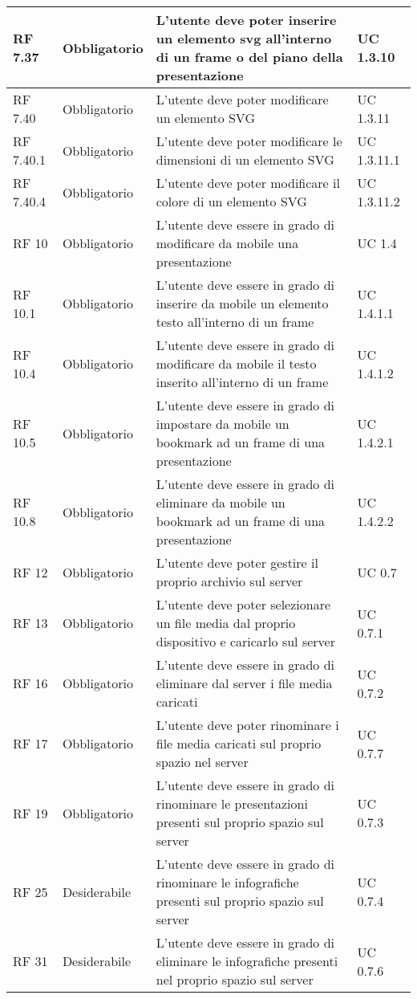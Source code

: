 {\begin{longtable} [c]{| p{2.5cm} | p{2.5cm} | p{6cm} |p{2.5cm}|}
 \hline 
RF 7.37 & Obbligatorio & L'utente deve poter inserire un elemento svg all'interno di un frame o del piano della presentazione & UC 1.3.10\\ 
 \hline 
RF 7.40 & Obbligatorio & L'utente deve poter modificare un elemento SVG & UC 1.3.11\\ 
 \hline 
RF 7.40.1 & Obbligatorio & L'utente deve poter modificare le dimensioni di un elemento SVG & UC 1.3.11.1\\ 
 \hline 
RF 7.40.4 & Obbligatorio & L'utente deve poter modificare il colore di un elemento SVG & UC 1.3.11.2\\ 
 \hline 
RF 10 & Obbligatorio & L’utente deve essere in grado di modificare da mobile una presentazione & UC 1.4\\ 
 \hline 
RF 10.1 & Obbligatorio & L'utente deve essere in grado di inserire da mobile un elemento testo all'interno di un frame & UC 1.4.1.1\\ 
 \hline 
RF 10.4 & Obbligatorio & L'utente deve essere in grado di modificare da mobile il testo inserito all'interno di un frame & UC 1.4.1.2\\ 
 \hline 
RF 10.5 & Obbligatorio & L'utente deve essere in grado di impostare da mobile un bookmark ad un frame di una presentazione & UC 1.4.2.1\\ 
 \hline 
RF 10.8 & Obbligatorio & L'utente deve essere in grado di eliminare da mobile un bookmark ad un frame di una presentazione & UC 1.4.2.2\\ 
 \hline 
RF 12 & Obbligatorio & L'utente deve poter gestire il proprio archivio sul server & UC 0.7\\ 
 \hline 
RF 13 & Obbligatorio & L’utente deve poter selezionare un file media dal proprio dispositivo e caricarlo sul server & UC 0.7.1\\ 
 \hline 
RF 16 & Obbligatorio & L’utente deve essere in grado di eliminare dal server i file media caricati & UC 0.7.2\\ 
 \hline 
RF 17 & Obbligatorio & L'utente deve poter rinominare i file media caricati sul proprio spazio nel server & UC 0.7.7\\ 
 \hline 
RF 19 & Obbligatorio & L'utente deve essere in grado di rinominare le presentazioni presenti sul proprio spazio sul server & UC 0.7.3\\ 
 \hline 
RF 25 & Desiderabile & L'utente deve essere in grado di rinominare le infografiche presenti sul proprio spazio sul server & UC 0.7.4\\ 
 \hline 
RF 31 & Desiderabile & L'utente deve essere in grado di eliminare le infografiche presenti nel proprio spazio sul server & UC 0.7.6\\ 

\end{longtable}}
